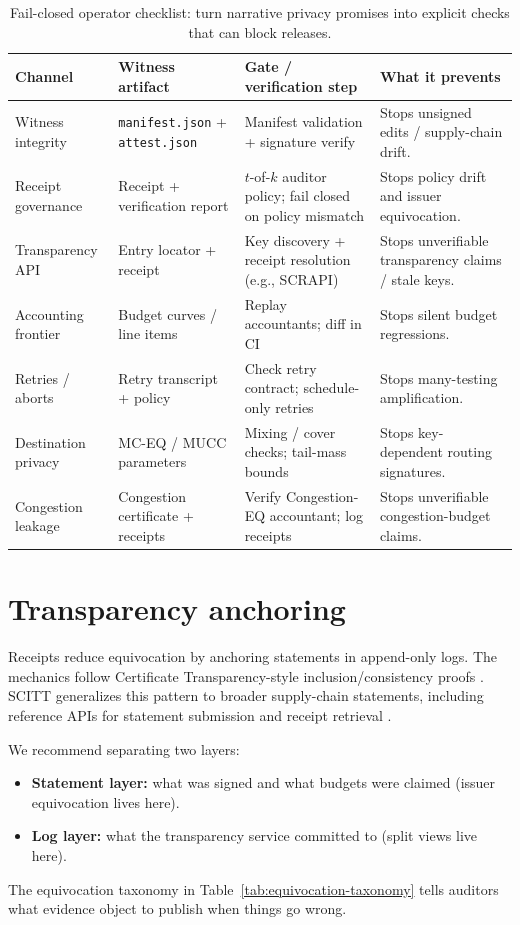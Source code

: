 \documentclass[11pt]{article}
\begin{document}
\begin{table}[t]
\centering
\small
\begin{tabular}{@{}p{2.0cm}p{3.6cm}p{5.0cm}p{3.1cm}@{}}
\toprule
Channel & Witness artifact & Gate / verification step & What it prevents \\
\midrule
Witness integrity & \texttt{manifest.json} + \texttt{attest.json} & Manifest validation + signature verify & Stops unsigned edits / supply-chain drift. \\
Receipt governance & Receipt + verification report & $t$-of-$k$ auditor policy; fail closed on policy mismatch & Stops policy drift and issuer equivocation. \\
Transparency API & Entry locator + receipt & Key discovery + receipt resolution (e.g., SCRAPI) \cite{scitt_scrapi} & Stops unverifiable transparency claims / stale keys. \\
Accounting frontier & Budget curves / line items & Replay accountants; diff in CI & Stops silent budget regressions. \\
Retries / aborts & Retry transcript + policy & Check retry contract; schedule-only retries \cite{series:schedretries} & Stops many-testing amplification. \\
Destination privacy & MC-EQ / MUCC parameters & Mixing / cover checks; tail-mass bounds & Stops key-dependent routing signatures. \\
Congestion leakage & Congestion certificate + receipts & Verify Congestion-EQ accountant; log receipts \cite{series:wcongeq} & Stops unverifiable congestion-budget claims. \\
\bottomrule
\end{tabular}
\caption{Fail-closed operator checklist: turn narrative privacy promises into explicit checks that can block releases.}
\label{tab:operator-checklist}
\end{table}

\section{Transparency anchoring}
\label{sec:transparency}
Receipts reduce equivocation by anchoring statements in append-only logs.
The mechanics follow Certificate Transparency-style inclusion/consistency proofs \cite{rfc9162}.
SCITT generalizes this pattern to broader supply-chain statements, including reference APIs for statement submission and receipt retrieval \cite{scitt_arch,scitt_scrapi}.

We recommend separating two layers:
\begin{itemize}[leftmargin=1.2em]
\item \textbf{Statement layer:} what was signed and what budgets were claimed (issuer equivocation lives here).
\item \textbf{Log layer:} what the transparency service committed to (split views live here).
\end{itemize}
The equivocation taxonomy in Table~\ref{tab:equivocation-taxonomy} tells auditors what evidence object to publish when things go wrong.
\end{document}
